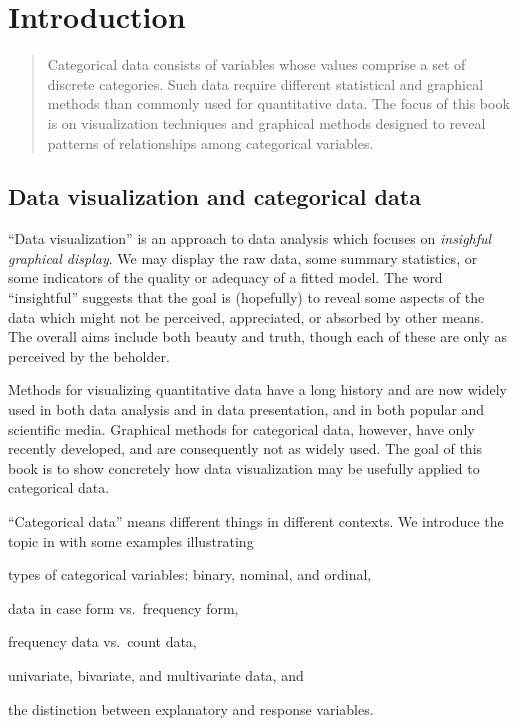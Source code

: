 \chapter{Introduction}\label{ch:intro}

\begin{quote}
{\Large
Categorical data consists of variables whose values comprise a set
of discrete categories.
Such data require different statistical and graphical methods
than commonly used for quantitative data.
The focus of this book is on visualization techniques and graphical
methods designed to reveal patterns of relationships among
categorical variables.
}
\end{quote}
\minitoc
\clearpage

\section{Data visualization and categorical data}

``Data visualization'' is an approach to data analysis which focuses
on \emph{insighful graphical display}.  We may display the raw data, some
summary statistics, or some indicators of the quality or adequacy
of a fitted model.  The word ``insightful'' suggests that the goal
is (hopefully) to reveal some aspects of the data which might not
be perceived, appreciated, or absorbed by other means.  The overall
aims include both beauty and truth, though each of these are 
only as perceived by the beholder.

Methods for visualizing quantitative data have a long history
and are now widely used in both data analysis and in data presentation, and
in both popular and scientific media.
Graphical methods for categorical data,
however, have only recently developed, and are consequently
not as widely used.  The goal of this book is to show concretely how
data visualization may be usefully applied to categorical data.

``Categorical data'' means different things in different
contexts.  We introduce the topic in 
with some examples illustrating
\begin{seriate}
\item types of categorical variables: binary, nominal, and ordinal,
\item data in case form vs.\ frequency form,
\item frequency data vs.\ count data,
\item univariate, bivariate, and multivariate data, and
\item the distinction between explanatory and response variables.
\end{seriate}

